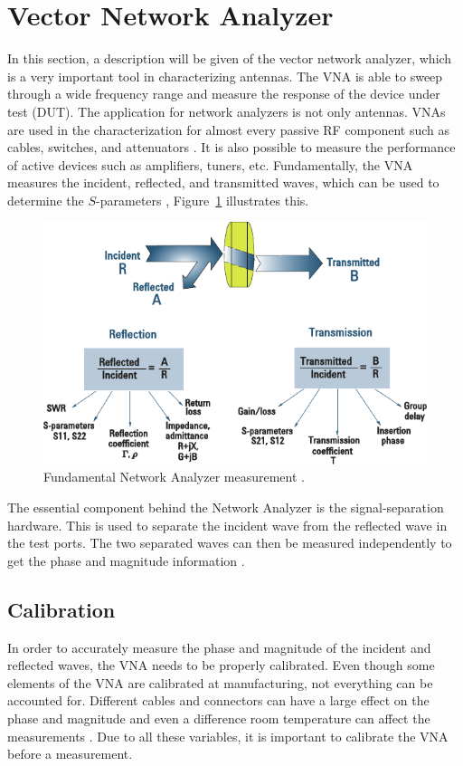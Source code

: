 \section{Vector Network Analyzer}

\begin{aautop}
In this section, a description will be given of the vector network analyzer, which is a very important tool in characterizing antennas.
The VNA is able to sweep through a wide frequency range and measure the response of the device under test (DUT). The application for network analyzers is not only antennas. VNAs are used in the characterization for almost every passive RF component such as cables, switches, and attenuators \cite{nationalInstruVNA}. It is also possible to measure the performance of active devices such as amplifiers, tuners, etc. Fundamentally, the VNA measures the incident, reflected, and transmitted waves, which can be used to determine the $S$-parameters \cite{nationalInstruVNA}, Figure~\ref{fig:vnaWaves} illustrates this.
\end{aautop}

\begin{figure}[htbp]
    \centering
    \includegraphics{img/analysis/vnaWaves.pdf}
    \caption{Fundamental Network Analyzer measurement \cite{agilentAppNoteVNA}.}
    \label{fig:vnaWaves}
\end{figure}

The essential component behind the Network Analyzer is the signal-separation hardware. This is used to separate the incident wave from the reflected wave in the test ports. The two separated waves can then be measured independently to get the phase and magnitude information \cite{nationalInstruVNA}. 

\subsection{Calibration}
In order to accurately measure the phase and magnitude of the incident and reflected waves, the VNA needs to be properly calibrated. Even though some elements of the VNA are calibrated at manufacturing, not everything can be accounted for. Different cables and connectors can have a large effect on the phase and magnitude and even a difference room temperature can affect the measurements \cite{nationalInstruVNA}. Due to all these variables, it is important to calibrate the VNA before a measurement.

